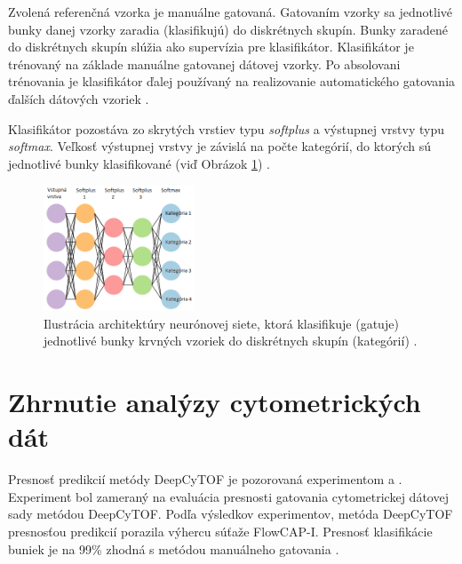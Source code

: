 Zvolená referenčná vzorka je manuálne gatovaná. Gatovaním vzorky sa jednotlivé bunky danej vzorky zaradia (klasifikujú) do diskrétnych skupín. Bunky zaradené do diskrétnych skupín slúžia ako supervízia pre klasifikátor. Klasifikátor je trénovaný na základe manuálne gatovanej dátovej vzorky. Po absolovani trénovania je klasifikátor ďalej používaný na realizovanie automatického gatovania ďalších dátových vzoriek \cite{Li2017}.

Klasifikátor pozostáva zo skrytých vrstiev typu \textit{softplus} \cite{Goh1995} a výstupnej vrstvy typu \textit{softmax}. Veľkosť výstupnej vrstvy je závislá na počte kategórií, do ktorých sú jednotlivé bunky klasifikované (viď Obrázok \ref{cell_classifier_arch}) \cite{Li2017}.

\begin{figure}
\centerline{\includegraphics[width=0.4\textwidth]{images/cell_classifier_arch.png}}
\caption[Architektúra bunkového klasifikátora]{Ilustrácia architektúry neurónovej siete, ktorá klasifikuje (gatuje) jednotlivé bunky krvných vzoriek do diskrétnych skupín (kategórií) \cite{Li2017}.}
\label{cell_classifier_arch}
\end{figure}

\section{Zhrnutie analýzy cytometrických dát}

Presnosť predikcií metódy DeepCyTOF je pozorovaná experimentom \cite{Li2017} a \cite{Li2016}. Experiment bol zameraný na evaluácia presnosti gatovania cytometrickej dátovej sady metódou DeepCyTOF. Podľa výsledkov experimentov, metóda DeepCyTOF presnosťou predikcií porazila výhercu súťaže FlowCAP-I. Presnosť klasifikácie buniek je na 99\% zhodná s metódou manuálneho gatovania \cite{Li2016}.

